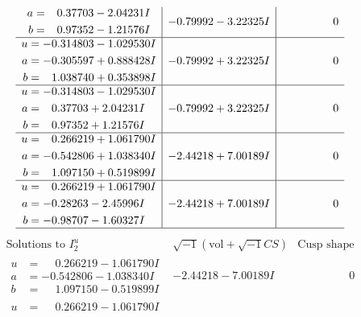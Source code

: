 \documentclass[1p]{elsarticle_modified}
\theoremstyle{definition}
\newcommand{\I}{\sqrt{-1}}
\begin{document}
$$\begin{array}{c|c|c}
\begin{aligned}
a &= \phantom{-}0.37703 - 2.04231 I \\
b &= \phantom{-}0.97352 - 1.21576 I\end{aligned}
 & -0.79992 - 3.22325 I & \phantom{-0.000000 } 0 \\ \hline\begin{aligned}
u &= -0.314803 - 1.029530 I \\
a &= -0.305597 + 0.888428 I \\
b &= \phantom{-}1.038740 + 0.353898 I\end{aligned}
 & -0.79992 + 3.22325 I & \phantom{-0.000000 } 0 \\ \hline\begin{aligned}
u &= -0.314803 - 1.029530 I \\
a &= \phantom{-}0.37703 + 2.04231 I \\
b &= \phantom{-}0.97352 + 1.21576 I\end{aligned}
 & -0.79992 + 3.22325 I & \phantom{-0.000000 } 0 \\ \hline\begin{aligned}
u &= \phantom{-}0.266219 + 1.061790 I \\
a &= -0.542806 + 1.038340 I \\
b &= \phantom{-}1.097150 + 0.519899 I\end{aligned}
 & -2.44218 + 7.00189 I & \phantom{-0.000000 } 0 \\ \hline\begin{aligned}
u &= \phantom{-}0.266219 + 1.061790 I \\
a &= -0.28263 - 2.45996 I \\
b &= -0.98707 - 1.60327 I\end{aligned}
 & -2.44218 + 7.00189 I & \phantom{-0.000000 } 0\\
 \hline 
 \end{array}$$\newpage$$\begin{array}{c|c|c}  
\text{Solutions to }I^u_{2}& \I (\text{vol} + \sqrt{-1}CS) & \text{Cusp shape}\\
 \hline 
\begin{aligned}
u &= \phantom{-}0.266219 - 1.061790 I \\
a &= -0.542806 - 1.038340 I \\
b &= \phantom{-}1.097150 - 0.519899 I\end{aligned}
 & -2.44218 - 7.00189 I & \phantom{-0.000000 } 0 \\ \hline\begin{aligned}
u &= \phantom{-}0.266219 - 1.061790 I \\

\end{aligned}
\end{array}$$
\end{document}

